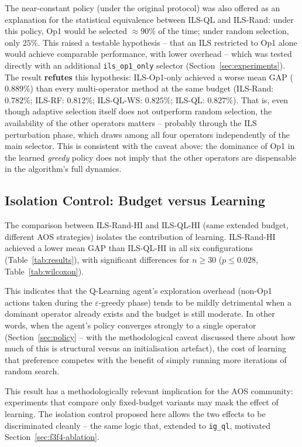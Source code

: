 \documentclass[final,3p,times,11pt,authoryear]{elsarticle}
\begin{document}
The near-constant policy (under the original protocol) was also
offered as an explanation for the statistical equivalence between
ILS-QL and ILS-Rand: under this policy, Op1 would be selected
$\approx 90\%$ of the time; under random selection, only $25\%$. This
raised a testable hypothesis -- that an ILS restricted to Op1 alone
would achieve comparable performance, with lower overhead -- which was
tested directly with an additional \texttt{ils\_op1\_only} selector
(Section~\ref{sec:experiments}). The result \textbf{refutes} this
hypothesis: ILS-Op1-only achieved a worse mean GAP ($0.889\%$) than
every multi-operator method at the same budget (ILS-Rand: $0.782\%$;
ILS-RF: $0.812\%$; ILS-QL-WS: $0.825\%$; ILS-QL: $0.827\%$). That is,
even though adaptive selection itself does not outperform random
selection, the availability of the other operators matters --
probably through the ILS perturbation phase, which draws among all
four operators independently of the main selector. This is consistent
with the caveat above: the dominance of Op1 in the learned
\emph{greedy} policy does not imply that the other operators are
dispensable in the algorithm's full dynamics.

\subsection{Isolation Control: Budget versus Learning}
\label{sec:isolation}

The comparison between ILS-Rand-HI and ILS-QL-HI (same extended
budget, different AOS strategies) isolates the contribution of
learning. ILS-Rand-HI achieved a lower mean GAP than ILS-QL-HI in all
six configurations (Table~\ref{tab:results}), with significant
differences for $n \geq 30$ ($p \leq 0.028$, Table~\ref{tab:wilcoxon}).

This indicates that the Q-Learning agent's exploration overhead
(non-Op1 actions taken during the $\varepsilon$-greedy phase) tends to
be mildly detrimental when a dominant operator already exists and the
budget is still moderate. In other words, when the agent's policy
converges strongly to a single operator (Section~\ref{sec:policy} --
with the methodological caveat discussed there about how much of this
is structural versus an initialisation artefact), the cost of
learning that preference competes with the benefit of simply running
more iterations of random search.

This result has a methodologically relevant implication for the AOS
community: experiments that compare only fixed-budget variants may
mask the effect of learning. The isolation control proposed here
allows the two effects to be discriminated cleanly -- the same logic
that, extended to \texttt{ig\_ql}, motivated
Section~\ref{sec:f3f4-ablation}.
\end{document}
